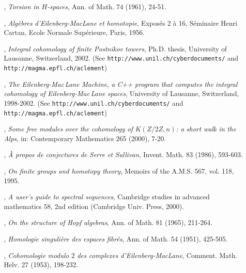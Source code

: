 \documentclass{conm-p-l}
\theoremstyle{definition}
\begin{document}

\begin{thebibliography}{99}

, \textit{Torsion in ${H}$-spaces}, Ann. of Math. 74 (1961), 24-51.

, \textit{Alg\`ebres d'Eilenberg-MacLane et homotopie}, Expos\'es 2 \`a 16, S\'eminaire Henri Cartan, Ecole Normale Sup\'erieure, Paris, 1956. 

, \textit{Integral cohomology of finite Postnikov towers}, Ph.D. thesis, University of Lausanne, Switzerland, 2002. (See {\tt http://www.unil.ch/cyberdocuments/} and {\tt http://magma.epfl.ch/aclement})

, \textit{The Eilenberg-Mac\,Lane Machine, a C++ program that computes the integral cohomology of Eilenberg-Mac\,Lane spaces}, University of Lausanne, Switzerland, 1998-2002. (See {\tt http://www.unil.ch/cyberdocuments/} and {\tt http://magma.epfl.ch/aclement})

, \textit{Some free modules over the cohomology of $K(Z/2Z,n)$: a short walk in the Alps}, in: Contemporary Mathematics 265 (2000), 7-20.

, \textit{\`A propos de conjectures de Serre et Sullivan}, Invent. Math. 83 (1986), 593-603.

, \textit{On finite groups and homotopy theory}, Memoirs of the A.M.S. 567, vol. 118, 1995.

, \textit{A user's guide to spectral sequences}, Cambridge studies in advanced mathematics 58, 2nd edition (Cambridge Univ. Press, 2000).

, \textit{On the structure of Hopf algebras}, Ann. of Math. 81 (1965), 211-264.

, \textit{Homologie singuli\`ere des espaces fibr\' es}, Ann. of Math. 54 (1951), 425-505.

, \textit{Cohomologie modulo $2$ des complexes d'Eilenberg-MacLane}, Comment. Math. Helv. 27 (1953), 198-232.

\end{thebibliography}
\end{document}
